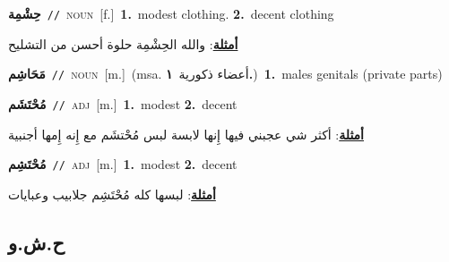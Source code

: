 \documentclass[10pt,a4paper,twoside]{article} %
\begin{document}
\begin{multicols}{2}
{\setlength\topsep{0pt}\textbf{\foreignlanguage{arabic}{حِشْمِة}}\ {\color{gray}\texttt{//}\color{black}}\ \textsc{noun}\ [f.]\ \textbf{1.}~modest clothing.  \textbf{2.}~decent clothing\  \begin{flushright}\color{gray}\foreignlanguage{arabic}{\textbf{\underline{\foreignlanguage{arabic}{أمثلة}}}: والله الحِشْمِة حلوة أحسن من التشليح}\end{flushright}\color{black}} \vspace{2mm}

{\setlength\topsep{0pt}\textbf{\foreignlanguage{arabic}{مَحَاشِم}}\ {\color{gray}\texttt{//}\color{black}}\ \textsc{noun}\ [m.]\ \color{gray}(msa. \foreignlanguage{arabic}{أعضاء ذكورية}~\foreignlanguage{arabic}{\textbf{١.}})\color{black}\ \textbf{1.}~males genitals (private parts)\ } \vspace{2mm}

{\setlength\topsep{0pt}\textbf{\foreignlanguage{arabic}{مُحْتَشَم}}\ {\color{gray}\texttt{//}\color{black}}\ \textsc{adj}\ [m.]\ \textbf{1.}~modest  \textbf{2.}~decent\  \begin{flushright}\color{gray}\foreignlanguage{arabic}{\textbf{\underline{\foreignlanguage{arabic}{أمثلة}}}: أكثر شي عجبني فيها إِنها لابسة لبس مُحْتشَم مع إِنه إِمها أجنبية}\end{flushright}\color{black}} \vspace{2mm}

{\setlength\topsep{0pt}\textbf{\foreignlanguage{arabic}{مُحْتَشِم}}\ {\color{gray}\texttt{//}\color{black}}\ \textsc{adj}\ [m.]\ \textbf{1.}~modest  \textbf{2.}~decent\  \begin{flushright}\color{gray}\foreignlanguage{arabic}{\textbf{\underline{\foreignlanguage{arabic}{أمثلة}}}: لبسها كله مُحْتَشِم جلابيب وعبايات}\end{flushright}\color{black}} \vspace{2mm}

\vspace{-3mm}
\subsection*{\color{blue}\foreignlanguage{arabic}{ح.ش.و}\color{blue}{}} 


\end{multicols}
\end{document}
